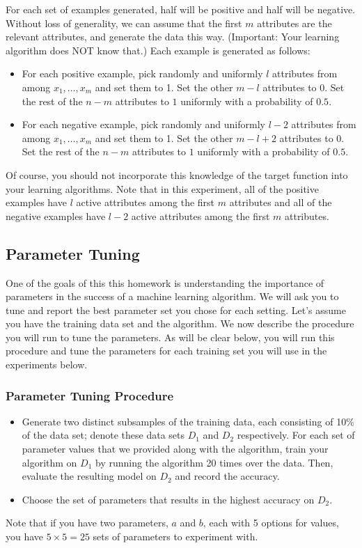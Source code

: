 For each set of examples generated, half will be positive and half
will be negative. Without loss of generality, we can assume that the
first $m$ attributes are the relevant attributes, and generate the
data this way.  (Important: Your learning algorithm does NOT know
that.)  Each example is generated as follows:

\begin{itemize}
\item For each positive example, pick randomly and uniformly $l$
  attributes from among $x_1, \ldots, x_m$ and set them to 1. Set the
  other $m-l$ attributes to 0. Set the rest of the $n-m$ attributes to
  $1$ uniformly with a probability of $0.5$.

\item For each negative example, pick randomly and uniformly $l-2$
  attributes from among $x_1, \ldots, x_m$ and set them to 1. Set the
  other $m-l+2$ attributes to 0. Set the rest of the $n-m$ attributes
  to $1$ uniformly with a probability of $0.5$.
\end{itemize}

Of course, you should not incorporate this knowledge of the target
function into your learning algorithms. Note that in this experiment,
all of the positive examples have $l$ active attributes among the
first $m$ attributes and all of the negative examples have $l-2$
active attributes among the first $m$ attributes.

\subsection*{Parameter Tuning}
One of the goals of this this homework is understanding the importance
of parameters in the success of a machine learning algorithm. We will
ask you to tune and report the best parameter set you chose for each
setting. Let’s assume you have the training data set and the
algorithm. We now describe the procedure you will run to tune the
parameters. As will be clear below, you will run this procedure and
tune the parameters for each training set you will use in the
experiments below.

\subsubsection*{Parameter Tuning Procedure}
\begin{itemize}
\item Generate two distinct subsamples of the training data, each consisting of 10\% of the data set; denote these data sets $D_1$ and $D_2$ respectively. For each set of parameter values that we provided along with the algorithm, train your algorithm on $D_1$ by running the algorithm 20 times over the data. Then, evaluate the resulting model 
on $D_2$ and record the accuracy.

\item Choose the set of parameters that results in the highest accuracy on $D_2$.
\end{itemize}
Note that if you have two parameters, $a$ and $b$, each with 5 options for values, you have $5 \times 5 = 25$ sets of parameters to experiment with.

